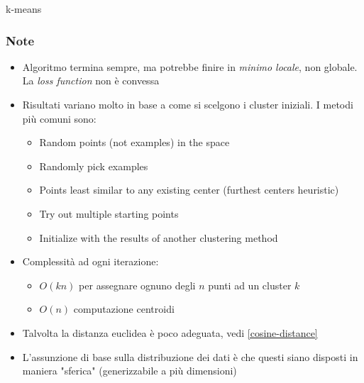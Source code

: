 \begin{algoritmo}{k-means}
	\begin{algorithm}[H]
	\end{algorithm}
\end{algoritmo}
\subsubsection{Note}
\begin{itemize}
	\item Algoritmo termina sempre, ma potrebbe finire in \textit{minimo locale}, non globale. La \textit{loss function} non è convessa
	\item Risultati variano molto in base a come si scelgono i cluster iniziali. I metodi più comuni sono:
	      \begin{itemize}
		      \item Random points (not examples) in the space
		      \item Randomly pick examples
		      \item Points least similar to any existing center (furthest centers heuristic)
		      \item Try out multiple starting points
		      \item Initialize with the results of another clustering method
	      \end{itemize}
	\item Complessità ad ogni iterazione:
	      \begin{itemize}
		      \item $ O\left(k n\right) $ per assegnare ognuno degli $ n $ punti ad un cluster $ k $
		      \item $ O\left(n\right) $ computazione centroidi
	      \end{itemize}
	\item Talvolta la distanza euclidea è poco adeguata, vedi \cref{cosine-distance}
	\item L'assunzione di base sulla distribuzione dei dati è che questi siano disposti in maniera "sferica" (generizzabile a più dimensioni)
\end{itemize}

